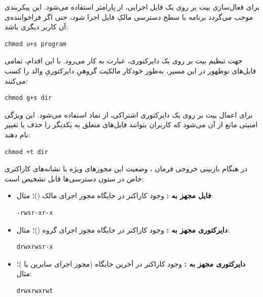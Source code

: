 برای فعال‌سازی بیت  بر روی یک فایل اجرایی، از پارامتر  استفاده می‌شود. این پیکربندی موجب می‌گردد برنامه با سطح دسترسی مالکِ فایل اجرا شود، حتی اگر فراخواننده‌ی آن کاربر دیگری باشد:

\begin{latin}
\begin{lstlisting}
chmod u+s program
\end{lstlisting}
\end{latin}

جهت تنظیم بیت  بر روی یک دایرکتوری، عبارت  به کار می‌رود. با این اقدام، تمامی فایل‌های نوظهور در این مسیر، به‌طور خودکار مالکیت گروهیِ دایرکتوریِ والد را کسب می‌کنند:

\begin{latin}
\begin{lstlisting}
chmod g+s dir
\end{lstlisting}
\end{latin}

برای اعمال بیت  بر روی یک دایرکتوری اشتراکی، از نماد  استفاده می‌شود. این ویژگی امنیتی مانع از آن می‌شود که کاربران بتوانند فایل‌های متعلق به یکدیگر را حذف یا تغییر نام دهند:

\begin{latin}
\begin{lstlisting}
chmod +t dir
\end{lstlisting}
\end{latin}

در هنگام بازبینی خروجی فرمان ، وضعیت این مجوزهای ویژه با نشانه‌های کاراکتری خاص در ستون دسترسی‌ها قابل تشخیص است:

\begin{itemize}
  \item \textbf{فایل مجهز به :} وجود کاراکتر  در جایگاه مجوز اجرای مالک ()؛ مثال:
\begin{latin}
\begin{lstlisting}
-rwsr-xr-x
\end{lstlisting}
\end{latin}

  \item \textbf{دایرکتوری مجهز به :} وجود کاراکتر  در جایگاه مجوز اجرای گروه ()؛ مثال:
\begin{latin}
\begin{lstlisting}
drwxrwsr-x
\end{lstlisting}
\end{latin}

  \item \textbf{دایرکتوری مجهز به :} وجود کاراکتر  در آخرین جایگاه (مجوز اجرای سایرین یا )؛ مثال:
\begin{latin}
\begin{lstlisting}
drwxrwxrwt
\end{lstlisting}
\end{latin}
\end{itemize}

